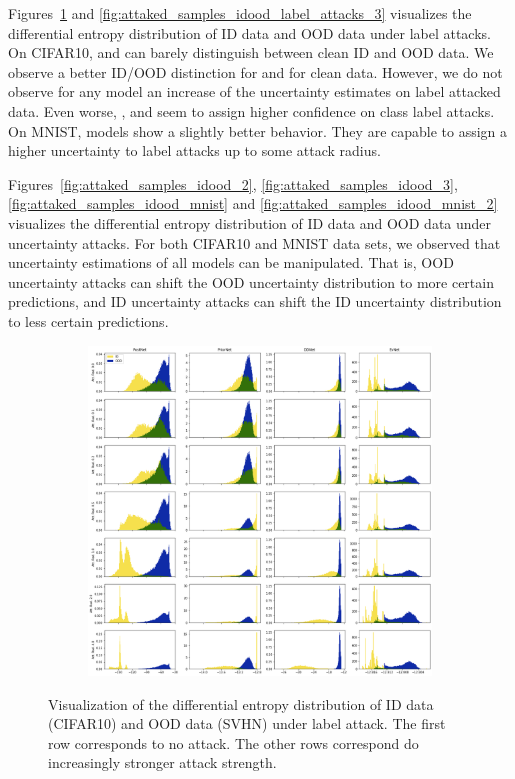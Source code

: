 Figures~\ref{fig:attaked_samples_idood_label_attacks_2} and \ref{fig:attaked_samples_idood_label_attacks_3} visualizes the differential entropy distribution of ID data and OOD data under label attacks. On CIFAR10, \PriorNet and \DDNet can barely distinguish between clean ID and OOD data. We observe a better ID/OOD distinction for \PostNetacro{}  and \EvNet for clean data. However, we do not observe for any model an increase of the uncertainty estimates on label attacked data. Even worse, \PostNet, \PriorNet and \DDNet seem to assign higher confidence on class label attacks. On MNIST, models show a slightly better behavior. They are capable to assign a higher uncertainty to label attacks up to some attack radius.

Figures~\ref{fig:attaked_samples_idood_2}, \ref{fig:attaked_samples_idood_3}, \ref{fig:attaked_samples_idood_mnist} and \ref{fig:attaked_samples_idood_mnist_2} visualizes the differential entropy distribution of ID data and OOD data under uncertainty attacks. For both CIFAR10 and MNIST data sets, we observed that uncertainty estimations of all models can be manipulated. That is, OOD uncertainty attacks can shift the OOD uncertainty distribution to more certain predictions, and ID uncertainty attacks can shift the ID uncertainty distribution to less certain predictions.


\begin{figure}[ht!]
    \centering
        \begin{subfigure}[t]{1.0\textwidth}
        \centering
        \includegraphics[width=0.99 \textwidth]{sections/008_icml2021/eval/unc_dist_label_id_cifar10_c.png}
    \end{subfigure}%
    \caption{Visualization of the differential entropy distribution of ID data (CIFAR10) and OOD data (SVHN) under label attack. The first row corresponds to no attack. The other rows correspond do increasingly stronger attack strength.}
    \label{fig:attaked_samples_idood_label_attacks_2}
	\vspace{-.5cm}
\end{figure}
\newpage

